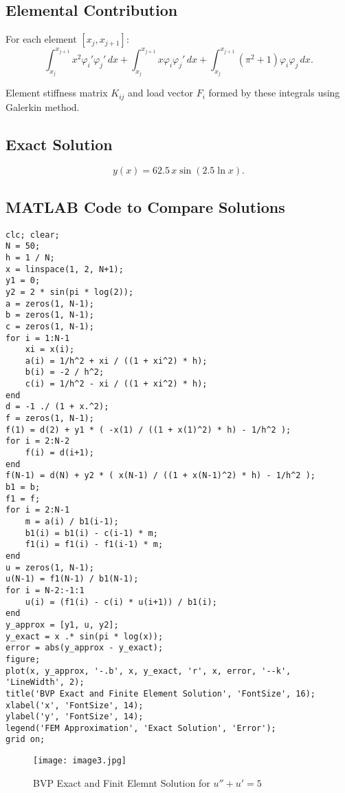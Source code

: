 \documentclass{article}
\begin{document}
\subsection*{Elemental Contribution}

For each element $[x_j, x_{j+1}]$:
\[
\int_{x_j}^{x_{j+1}} x^2 \varphi_i' \varphi_j' \, dx + \int_{x_j}^{x_{j+1}} x \varphi_i \varphi_j' \, dx + \int_{x_j}^{x_{j+1}} (\pi^2 + 1) \varphi_i \varphi_j \, dx.
\]

Element stiffness matrix $K_{ij}$ and load vector $F_i$ formed by these integrals using Galerkin method.

\subsection*{Exact Solution}

\[
y(x) = 62.5 \, x \sin(2.5 \ln x).
\]

\subsection*{MATLAB Code to Compare Solutions}


\begin{tcolorbox}[title=Finite Element Method (Piecewise Linear Basis)]
\begin{lstlisting}
clc; clear;
N = 50;
h = 1 / N;
x = linspace(1, 2, N+1);
y1 = 0;
y2 = 2 * sin(pi * log(2));
a = zeros(1, N-1);
b = zeros(1, N-1);
c = zeros(1, N-1);
for i = 1:N-1
    xi = x(i);
    a(i) = 1/h^2 + xi / ((1 + xi^2) * h);
    b(i) = -2 / h^2;
    c(i) = 1/h^2 - xi / ((1 + xi^2) * h);
end
d = -1 ./ (1 + x.^2);
f = zeros(1, N-1);
f(1) = d(2) + y1 * ( -x(1) / ((1 + x(1)^2) * h) - 1/h^2 );
for i = 2:N-2
    f(i) = d(i+1);
end
f(N-1) = d(N) + y2 * ( x(N-1) / ((1 + x(N-1)^2) * h) - 1/h^2 );
b1 = b;
f1 = f;
for i = 2:N-1
    m = a(i) / b1(i-1);
    b1(i) = b1(i) - c(i-1) * m;
    f1(i) = f1(i) - f1(i-1) * m;
end
u = zeros(1, N-1);
u(N-1) = f1(N-1) / b1(N-1);
for i = N-2:-1:1
    u(i) = (f1(i) - c(i) * u(i+1)) / b1(i);
end
y_approx = [y1, u, y2];
y_exact = x .* sin(pi * log(x));
error = abs(y_approx - y_exact);
figure;
plot(x, y_approx, '-.b', x, y_exact, 'r', x, error, '--k', 'LineWidth', 2);
title('BVP Exact and Finite Element Solution', 'FontSize', 16);
xlabel('x', 'FontSize', 14);
ylabel('y', 'FontSize', 14);
legend('FEM Approximation', 'Exact Solution', 'Error');
grid on;
\end{lstlisting}
\end{tcolorbox}

\begin{figure}[h!]
    \centering
    \texttt{[image: image3.jpg]}
    \caption{BVP Exact and Finit Elemnt Solution for $u'' + u' = 5$}
    \label{fig:fem_solution}
\end{figure}
\end{document}
